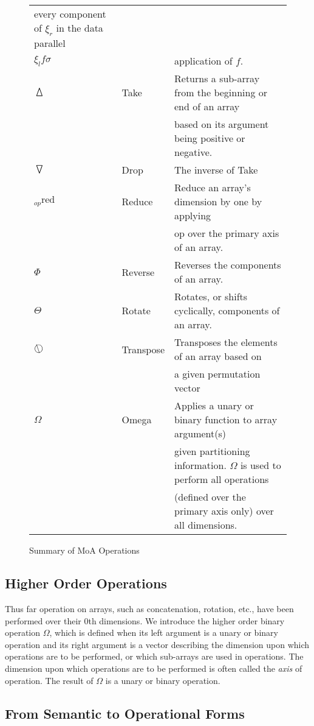 \begin{figure}[h]
\begin{tabular}{|l|l|l|}
every component of $\xi_r$ in the data parallel \\
$\xi_l f \sigma$ & &application of $f$. \\ \hline
$\,\bigtriangleup\,$&Take& Returns a sub-array from the beginning or end of an array\\
& & based on its argument being positive or negative. \\ \hline
$\,\bigtriangledown\,$ & Drop & The inverse of Take \\ \hline
$_{op} \mbox{red}$&Reduce& Reduce an array's dimension by one by applying \\
& & op over the primary axis of an array. \\ \hline
$\Phi$& Reverse& Reverses the components of an array. \\ \hline
$\Theta $& Rotate & Rotates, or shifts cyclically, components of an
array. \\ \hline
$\bigcirc\!\!\!\!\!\backslash\;$ & Transpose & Transposes the elements of an array based on \\
&&a given permutation vector \\ \hline
$\Omega$& Omega& Applies a unary or binary function to array argument(s) \\
&&given partitioning information. $\Omega$ is used to perform all operations \\&& (defined over the primary axis only) over all dimensions. \\ \hline
\end{tabular}
\caption{\label{moa}Summary of MoA Operations}
\end{figure}

\subsection*{Higher Order Operations}

Thus far operation on arrays, such as concatenation, rotation, etc., have been 
performed over their 0th dimensions.  We introduce the higher order binary 
operation $\Omega$, which is defined when its left argument is a unary or binary
operation and its right argument is a vector describing the dimension upon 
which operations are to be performed, or which sub-arrays are used in 
operations.  The dimension upon which operations are to be performed is often 
called the {\it axis} of operation.  The result of $\Omega$ is a unary or 
binary operation.

\subsection*{From Semantic to Operational Forms}

